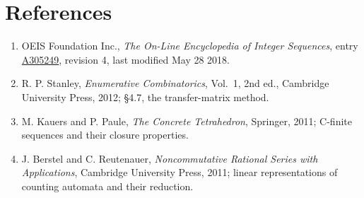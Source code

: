 \documentclass[11pt]{article}
\theoremstyle{definition}
\begin{document}
\section{References}

\begin{enumerate}

\item OEIS Foundation Inc., \emph{The On-Line Encyclopedia of Integer Sequences}, entry \href{https://oeis.org/A305249}{A305249}, revision 4, last modified May 28 2018.

\item R. P. Stanley, \emph{Enumerative Combinatorics}, Vol.~1, 2nd ed., Cambridge University Press, 2012; \S4.7, the transfer-matrix method.

\item M. Kauers and P. Paule, \emph{The Concrete Tetrahedron}, Springer, 2011; C-finite sequences and their closure properties.

\item J. Berstel and C. Reutenauer, \emph{Noncommutative Rational Series with Applications}, Cambridge University Press, 2011; linear representations of counting automata and their reduction.

\end{enumerate}
\end{document}
